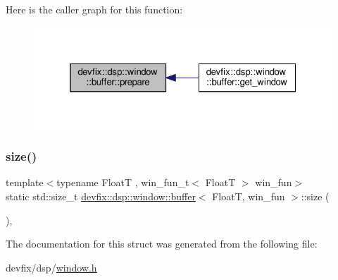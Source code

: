 Here is the caller graph for this function\+:\nopagebreak
\begin{figure}[H]
\begin{center}
\leavevmode
\includegraphics[width=325pt]{structdevfix_1_1dsp_1_1window_1_1buffer_a3ace062676326a9981118d53b8ba5900_icgraph}
\end{center}
\end{figure}
\mbox{\label{structdevfix_1_1dsp_1_1window_1_1buffer_af1215d236069b0848e7211e5f697b3fa}} 
\subsubsection{\texorpdfstring{size()}{size()}}
{\footnotesize\ttfamily template$<$typename FloatT , win\+\_\+fun\+\_\+t$<$ Float\+T $>$ win\+\_\+fun$>$ \\
static std\+::size\+\_\+t \hyperlink{structdevfix_1_1dsp_1_1window_1_1buffer}{devfix\+::dsp\+::window\+::buffer}$<$ FloatT, win\+\_\+fun $>$\+::size (\begin{DoxyParamCaption}{ }\end{DoxyParamCaption})\hspace{0.3cm}{\ttfamily [inline]}, {\ttfamily [static]}}



The documentation for this struct was generated from the following file\+:\begin{DoxyCompactItemize}
\item 
devfix/dsp/\hyperlink{window_8h}{window.\+h}\end{DoxyCompactItemize}

